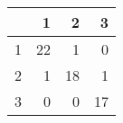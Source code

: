 \begin{tabular}{rrrr}
  \hline
 & 1 & 2 & 3 \\ 
  \hline
1 &  22 &   1 &   0 \\ 
  2 &   1 &  18 &   1 \\ 
  3 &   0 &   0 &  17 \\ 
   \hline
\end{tabular}

